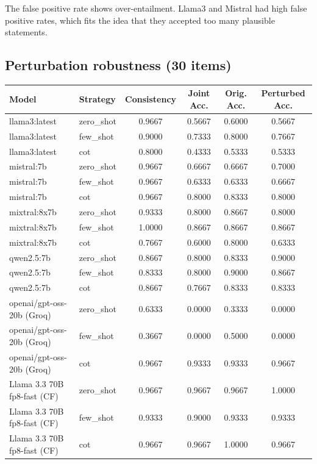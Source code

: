 \documentclass[11pt, a4paper]{article}
\begin{document}
The false positive rate shows over-entailment. Llama3 and Mistral had high false positive rates, which fits the idea that they accepted too many plausible statements.

\subsection*{\color{bambergnavy} Perturbation robustness (30 items)}
\begin{table}[htbp]
\centering
\scriptsize
\setlength{\tabcolsep}{5pt}
\renewcommand{\arraystretch}{1.2}
\begin{tabularx}{\textwidth}{>{\raggedright\arraybackslash}X l c c c c}
\toprule
\rowcolor{labeltint}
\textbf{Model} & \textbf{Strategy} & \textbf{Consistency} & \textbf{Joint Acc.} & \textbf{Orig. Acc.} & \textbf{Perturbed Acc.} \\
\midrule
llama3:latest & zero\_shot & 0.9667 & 0.5667 & 0.6000 & 0.5667 \\
llama3:latest & few\_shot & 0.9000 & 0.7333 & 0.8000 & 0.7667 \\
llama3:latest & cot & 0.8000 & 0.4333 & 0.5333 & 0.5333 \\
\midrule
mistral:7b & zero\_shot & 0.9667 & 0.6667 & 0.6667 & 0.7000 \\
mistral:7b & few\_shot & 0.9667 & 0.6333 & 0.6333 & 0.6667 \\
mistral:7b & cot & 0.9667 & 0.8000 & 0.8333 & 0.8000 \\
\midrule
mixtral:8x7b & zero\_shot & 0.9333 & 0.8000 & 0.8667 & 0.8000 \\
mixtral:8x7b & few\_shot & 1.0000 & 0.8667 & 0.8667 & 0.8667 \\
mixtral:8x7b & cot & 0.7667 & 0.6000 & 0.8000 & 0.6333 \\
\midrule
qwen2.5:7b & zero\_shot & 0.8667 & 0.8000 & 0.8333 & 0.9000 \\
qwen2.5:7b & few\_shot & 0.8333 & 0.8000 & 0.9000 & 0.8667 \\
qwen2.5:7b & cot & 0.8667 & 0.7667 & 0.8333 & 0.8333 \\
\midrule
openai/gpt-oss-20b (Groq) & zero\_shot & 0.6333 & 0.0000 & 0.3333 & 0.0000 \\
openai/gpt-oss-20b (Groq) & few\_shot & 0.3667 & 0.0000 & 0.5000 & 0.0000 \\
openai/gpt-oss-20b (Groq) & cot & 0.9667 & 0.9333 & 0.9333 & 0.9667 \\
\midrule
Llama 3.3 70B fp8-fast (CF) & zero\_shot & 0.9667 & 0.9667 & 0.9667 & 1.0000 \\
Llama 3.3 70B fp8-fast (CF) & few\_shot & 0.9333 & 0.9000 & 0.9333 & 0.9333 \\
Llama 3.3 70B fp8-fast (CF) & cot & 0.9667 & 0.9667 & 1.0000 & 0.9667 \\
\bottomrule
\end{tabularx}
\end{table}
\end{document}
